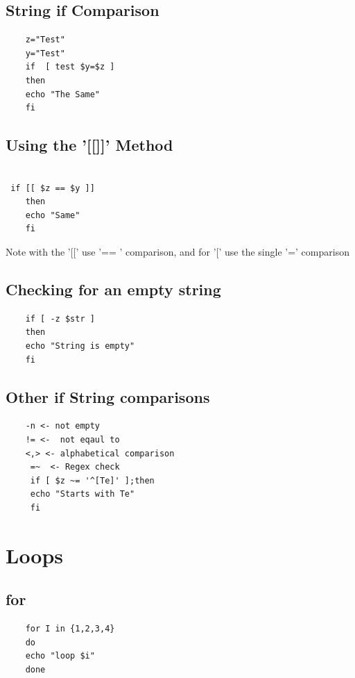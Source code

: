\documentclass[22pt] {article}
\begin{document}
\subsection{String if Comparison}
\begin{lstlisting}
	z="Test"
	y="Test" 
	if  [ test $y=$z ] 
	then
	echo "The Same"
	fi
\end{lstlisting}

\subsection{ Using the '[[]]' Method}
 \begin{lstlisting}
 	
 if [[ $z == $y ]]
 	then
 	echo "Same"
 	fi
\end{lstlisting}

Note with the '[['  use '== ' comparison,  and for '[' use the single '=' comparison

\subsection{Checking for an empty string}
 \begin{lstlisting}
 	if [ -z $str ]
 	then                           
 	echo "String is empty"
 	fi
\end{lstlisting}

\pagebreak

 \subsection{Other  if String comparisons}
 \begin{lstlisting}
 	-n <- not empty 
 	!= <-  not eqaul to
 	<,> <- alphabetical comparison
 	 =~  <- Regex check 	 
 	 if [ $z ~= '^[Te]' ];then
 	 echo "Starts with Te" 
 	 fi
\end{lstlisting}

\pagebreak
\section{Loops}
\subsection{for}

\begin{lstlisting}
	for I in {1,2,3,4}
	do
	echo "loop $i"
	done
\end{lstlisting}
	
\end{document}
